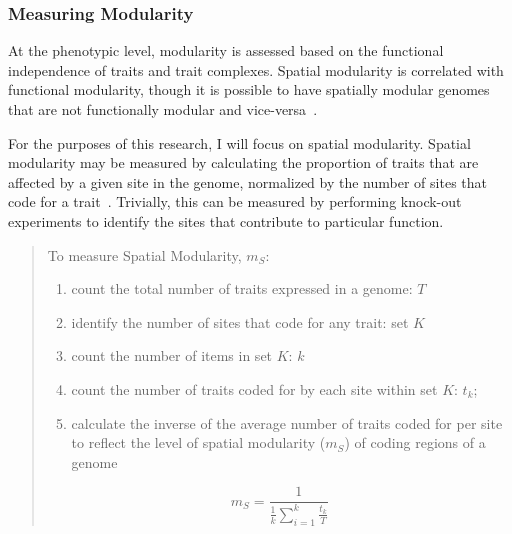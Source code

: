 \documentclass[PhD]{msu-thesis}
\begin{document}

\subsubsection{Measuring Modularity}
At the phenotypic level, modularity is assessed based on the functional independence of traits and trait complexes. Spatial modularity is correlated with functional modularity, though it is possible to have spatially modular genomes that are not functionally modular and vice-versa~\cite{pavlicev_model_2012,mezey_is_2000}.  

For the purposes of this research, I will focus on spatial modularity. Spatial modularity may be measured by calculating the proportion of traits that are affected by a given site in the genome, normalized by the number of sites that code for a trait~\cite{misevic_sexual_2006}. Trivially, this can be measured by performing knock-out experiments to identify the sites that contribute to particular function.

\begin{quote}
To measure Spatial Modularity, $m_S$:

\begin{enumerate}
\item count the total number of traits expressed in a genome: $T$
\item identify the number of sites that code for any trait: set $K$
\item count the number of items in set $K$: $k$
\item count the number of traits coded for by each site within set $K$: $t_k$;
\item calculate the inverse of the average number of traits coded for per site to reflect the level of spatial modularity ($m_S$) of coding regions of a genome
\end{enumerate}
\begin{equation}
m_S = \frac{1}{\frac{1}{k} {\sum_{i=1}^{k} \frac{t_{k}}{T}}} 
\end{equation}
\end{quote}
\end{document}
